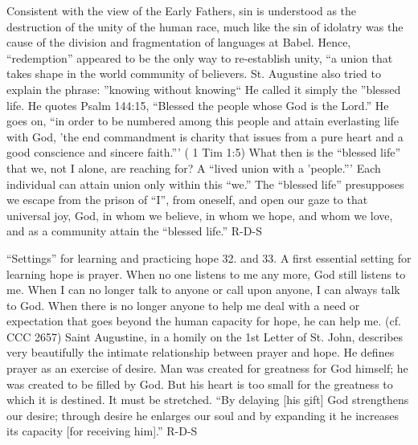 \documentclass[oneside]{book}
\begin{document}
Consistent with the view of the Early Fathers, sin is understood as the
destruction of the unity of the human race, much like the sin of idolatry was
the cause of the division and fragmentation of languages at Babel. Hence,
``redemption'' appeared to be the only way to re-establish unity, ``a union that
takes shape in the world community of believers. St. Augustine also tried to
explain the phrase: ''knowing without knowing`` He called it simply the
''blessed life. He quotes Psalm 144:15, ``Blessed the people whose God is the
Lord.'' He goes on, ``in order to be numbered among this people and attain
everlasting life with God, 'the end commandment is charity that issues from a
pure heart and a good conscience and sincere faith.''' ( 1 Tim 1:5) What then is
the ``blessed life'' that we, not I alone, are reaching for? A ``lived union
with a 'people.''' Each individual can attain union only within this ``we.'' The
``blessed life'' presupposes we escape from the prison of ``I'', from oneself,
and open our gaze to that universal joy, God, in whom we believe, in whom we
hope, and whom we love, and as a community attain the ``blessed life.''
R-D-S

``Settings'' for learning and practicing hope
32. and 33.  A first essential setting for learning hope is prayer. When no one
listens to me any more, God still listens to me. When I can no longer talk to
anyone or call upon anyone, I can always talk to God. When there is no longer
anyone to help me deal with a need or expectation that goes beyond the human
capacity for hope, he can help me. (cf. CCC 2657) Saint Augustine, in a homily
on the 1st Letter of St. John, describes very beautifully the intimate
relationship between prayer and hope. He defines prayer as an exercise of
desire. Man was created for greatness  for God himself; he was created to be
filled by God. But his heart is too small for the greatness to which it is
destined. It must be stretched. ``By delaying [his gift] God strengthens our
desire; through desire he enlarges our soul and by expanding it he increases its
capacity [for receiving him].''
R-D-S
\end{document}
